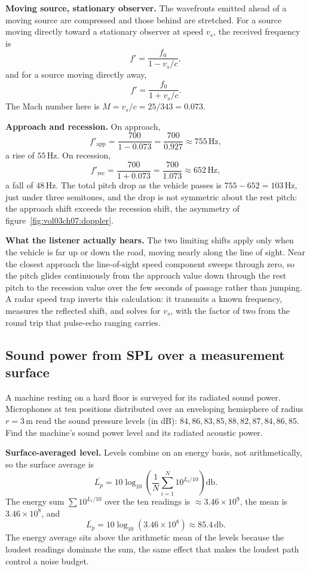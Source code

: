 \textbf{Moving source, stationary observer.} The wavefronts emitted
ahead of a moving source are compressed and those behind are stretched.
For a source moving directly toward a stationary observer at speed
$v_s$, the received frequency is
\[
f' = \frac{f_0}{1 - v_s/c},
\]
and for a source moving directly away,
\[
f' = \frac{f_0}{1 + v_s/c}.
\]
The Mach number here is $M = v_s/c = 25/343 = 0.073$.

\textbf{Approach and recession.} On approach,
\[
f'_{\text{app}} = \frac{700}{1 - 0.073} = \frac{700}{0.927}
               \approx 755\,\si{\hertz},
\]
a rise of $55\,\si{\hertz}$. On recession,
\[
f'_{\text{rec}} = \frac{700}{1 + 0.073} = \frac{700}{1.073}
               \approx 652\,\si{\hertz},
\]
a fall of $48\,\si{\hertz}$. The total pitch drop as the vehicle passes
is $755 - 652 = 103\,\si{\hertz}$, just under three semitones, and the
drop is not symmetric about the rest pitch: the approach shift exceeds
the recession shift, the asymmetry of figure~\ref{fig:vol03ch07:doppler}.

\textbf{What the listener actually hears.} The two limiting shifts apply
only when the vehicle is far up or down the road, moving nearly along
the line of sight. Near the closest approach the line-of-sight speed
component sweeps through zero, so the pitch glides continuously from the
approach value down through the rest pitch to the recession value over
the few seconds of passage rather than jumping. A radar speed trap
inverts this calculation: it transmits a known frequency, measures the
reflected shift, and solves for $v_s$, with the factor of two from the
round trip that pulse-echo ranging carries.



\subsection{Sound power from SPL over a measurement surface}

A machine resting on a hard floor is surveyed for its radiated sound
power. Microphones at ten positions distributed over an enveloping
hemisphere of radius $r = 3\,\si{\meter}$ read the sound pressure
levels (in dB): $84, 86, 83, 85, 88, 82, 87, 84, 86, 85$. Find the
machine's sound power level and its radiated acoustic power.

\textbf{Surface-averaged level.} Levels combine on an energy basis, not
arithmetically, so the surface average is
\[
\overline{L_p} = 10\log_{10}\!\left(\frac{1}{N}\sum_{i=1}^{N}
10^{L_i/10}\right)\si{\decibel}.
\]
The energy sum $\sum 10^{L_i/10}$ over the ten readings is
$\approx 3.46\times 10^{9}$, the mean is $3.46\times 10^{8}$, and
\[
\overline{L_p} = 10\log_{10}(3.46\times 10^{8}) \approx 85.4\,\si{
\decibel}.
\]
The energy average sits above the arithmetic mean of the levels because
the loudest readings dominate the sum, the same effect that makes the
loudest path control a noise budget.

